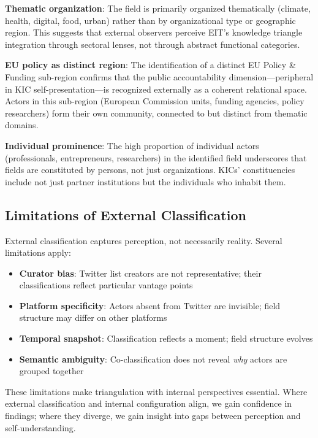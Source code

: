 \documentclass[../main.tex]{subfiles}
\begin{document}
\textbf{Thematic organization}: The field is primarily organized thematically (climate, health, digital, food, urban) rather than by organizational type or geographic region. This suggests that external observers perceive EIT's knowledge triangle integration through sectoral lenses, not through abstract functional categories.

\textbf{EU policy as distinct region}: The identification of a distinct EU Policy \& Funding sub-region confirms that the public accountability dimension---peripheral in KIC self-presentation---is recognized externally as a coherent relational space. Actors in this sub-region (European Commission units, funding agencies, policy researchers) form their own community, connected to but distinct from thematic domains.

\textbf{Individual prominence}: The high proportion of individual actors (professionals, entrepreneurs, researchers) in the identified field underscores that fields are constituted by persons, not just organizations. KICs' constituencies include not just partner institutions but the individuals who inhabit them.


\subsection{Limitations of External Classification}

External classification captures perception, not necessarily reality. Several limitations apply:

\begin{itemize}
    \item \textbf{Curator bias}: Twitter list creators are not representative; their classifications reflect particular vantage points
    \item \textbf{Platform specificity}: Actors absent from Twitter are invisible; field structure may differ on other platforms
    \item \textbf{Temporal snapshot}: Classification reflects a moment; field structure evolves
    \item \textbf{Semantic ambiguity}: Co-classification does not reveal \textit{why} actors are grouped together
\end{itemize}

These limitations make triangulation with internal perspectives essential. Where external classification and internal configuration align, we gain confidence in findings; where they diverge, we gain insight into gaps between perception and self-understanding.
\end{document}
